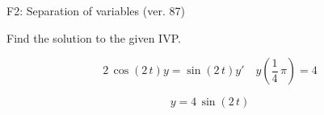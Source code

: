 \begin{exercise}
  \begin{exerciseTitle}F2: Separation of variables (ver. 87)\end{exerciseTitle}
  \begin{exerciseStatement}
    
Find the solution to the given IVP.

    
\[2 \, \cos\left(2 \, t\right) y= \sin\left(2 \, t\right) y'\hspace{1em} y\left( \frac{1}{4} \, \pi \right)= 4\]

  \end{exerciseStatement}
  \begin{exerciseAnswer}
    
\[y= 4 \, \sin\left(2 \, t\right)\]

  \end{exerciseAnswer}
\end{exercise}
